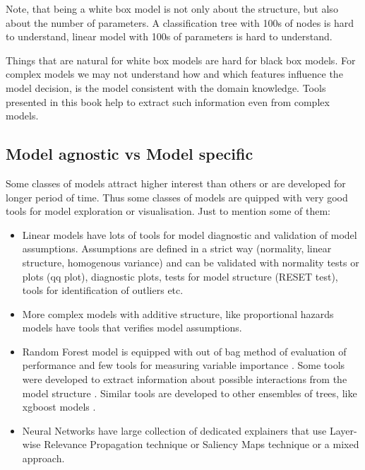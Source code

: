 \documentclass[]{krantz}
\providecommand{\tightlist}{%
  \setlength{\itemsep}{0pt}\setlength{\parskip}{0pt}}
\theoremstyle{definition}
\theoremstyle{definition}
\theoremstyle{definition}
\theoremstyle{remark}
\begin{document}
Note, that being a white box model is not only about the structure, but
also about the number of parameters. A classification tree with 100s of
nodes is hard to understand, linear model with 100s of parameters is
hard to understand.

Things that are natural for white box models are hard for black box
models. For complex models we may not understand how and which features
influence the model decision, is the model consistent with the domain
knowledge. Tools presented in this book help to extract such information
even from complex models.

\hypertarget{model-agnostic-vs-model-specific}{%
\subsection{Model agnostic vs Model
specific}\label{model-agnostic-vs-model-specific}}

Some classes of models attract higher interest than others or are
developed for longer period of time. Thus some classes of models are
quipped with very good tools for model exploration or visualisation.
Just to mention some of them:

\begin{itemize}
\tightlist
\item
  Linear models have lots of tools for model diagnostic and validation
  of model assumptions. Assumptions are defined in a strict way
  (normality, linear structure, homogenous variance) and can be
  validated with normality tests or plots (qq plot), diagnostic plots,
  tests for model structure (RESET test), tools for identification of
  outliers etc.
\item
  More complex models with additive structure, like proportional hazards
  models have tools that verifies model assumptions.
\item
  Random Forest model is equipped with out of bag method of evaluation
  of performance and few tools for measuring variable importance
  \citep{R-randomForest}. Some tools were developed to extract
  information about possible interactions from the model structure
  \citep{R-randomForestExplainer}. Similar tools are developed to other
  ensembles of trees, like xgboost models \citep{R-xgboostExplainer}.
\item
  Neural Networks have large collection of dedicated explainers that use
  Layer-wise Relevance Propagation technique \citep{BachLWRP} or
  Saliency Maps technique \citep{SaliencyMaps} or a mixed approach.
\end{itemize}
\end{document}
